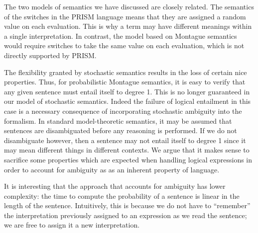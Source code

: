 \documentclass[11pt]{article}
\theoremstyle{definition}
\begin{document}
The two models of semantics we have discussed are closely
related.
The semantics
of the switches in the PRISM language means that they are assigned
a random value on each evaluation. This is why a term may have different meanings
within a single interpretation. In contrast, the model based on
Montague semantics would require switches to take the same value on
each evaluation, which is not directly supported by PRISM.

The flexibility granted by stochastic semantics results
in the loss of certain nice properties. Thus, for
probabilistic Montague semantics, it is easy to verify that any given sentence must entail itself to degree 1. This is
no longer guaranteed in our model of stochastic semantics. Indeed
the failure of logical entailment in this case is a necessary consequence of incorporating stochastic
ambiguity into the formalism. In standard model-theoretic semantics,
it may be assumed that sentences are disambiguated before any reasoning is
performed. If we do not disambiguate however, then a sentence may not entail itself to degree 1 since it may mean different things
in different contexts. We argue that it makes sense to
sacrifice some properties which are expected when handling logical
expressions in order to account for ambiguity as
as an inherent property of language.

It is interesting that the approach that accounts for ambiguity has
lower complexity: the time to compute the probability of a sentence is
linear in the length of the sentence. Intuitively, this is because we
do not have to ``remember'' the interpretation previously assigned to
an expression as we read the sentence; we are free to assign it a new
interpretation.




\end{document}
